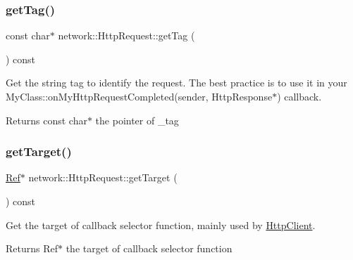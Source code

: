 \subsubsection{\texorpdfstring{get\+Tag()}{getTag()}\hspace{0.1cm}{\footnotesize\ttfamily [2/2]}}
{\footnotesize\ttfamily const char$\ast$ network\+::\+Http\+Request\+::get\+Tag (\begin{DoxyParamCaption}{ }\end{DoxyParamCaption}) const\hspace{0.3cm}{\ttfamily [inline]}}

Get the string tag to identify the request. The best practice is to use it in your My\+Class\+::on\+My\+Http\+Request\+Completed(sender, Http\+Response$\ast$) callback.

\begin{DoxyReturn}{Returns}
const char$\ast$ the pointer of \+\_\+tag 
\end{DoxyReturn}
\mbox{\label{classnetwork_1_1HttpRequest_ac372c9d736add6a9c5bdcbfda7f7f1f5}} 
\subsubsection{\texorpdfstring{get\+Target()}{getTarget()}\hspace{0.1cm}{\footnotesize\ttfamily [1/2]}}
{\footnotesize\ttfamily \hyperlink{classRef}{Ref}$\ast$ network\+::\+Http\+Request\+::get\+Target (\begin{DoxyParamCaption}{ }\end{DoxyParamCaption}) const\hspace{0.3cm}{\ttfamily [inline]}}

Get the target of callback selector function, mainly used by \hyperlink{classnetwork_1_1HttpClient}{Http\+Client}.

\begin{DoxyReturn}{Returns}
Ref$\ast$ the target of callback selector function 
\end{DoxyReturn}
\mbox{\label{classnetwork_1_1HttpRequest_ac372c9d736add6a9c5bdcbfda7f7f1f5}} 
